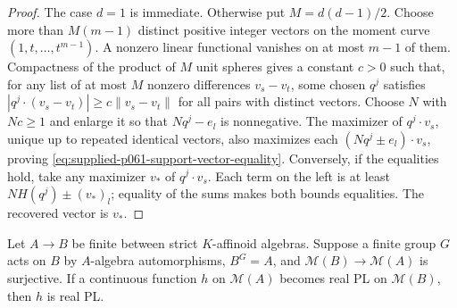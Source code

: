 \begin{proof}
The case $d=1$ is immediate. Otherwise put $M=d(d-1)/2$. Choose more than $M(m-1)$ distinct positive integer vectors on the moment curve $(1,t,\ldots,t^{m-1})$. A nonzero linear functional vanishes on at most $m-1$ of them. Compactness of the product of $M$ unit spheres gives a constant $c>0$ such that, for any list of at most $M$ nonzero differences $v_s-v_t$, some chosen $q^j$ satisfies $|q^j\cdot(v_s-v_t)|\geq c\|v_s-v_t\|$ for all pairs with distinct vectors. Choose $N$ with $Nc\geq1$ and enlarge it so that $Nq^j-e_l$ is nonnegative. The maximizer of $q^j\cdot v_s$, unique up to repeated identical vectors, also maximizes each $(Nq^j\pm e_l)\cdot v_s$, proving \eqref{eq:supplied-p061-support-vector-equality}. Conversely, if the equalities hold, take any maximizer $v_*$ of $q^j\cdot v_s$. Each term on the left is at least $NH(q^j)\pm(v_*)_l$; equality of the sums makes both bounds equalities. The recovered vector is $v_*$.
\end{proof}

\begin{proposition}\label{prop:supplied-p061-finite-group-descent}
Let $A\to B$ be finite between strict $K$-affinoid algebras. Suppose a finite group $G$ acts on $B$ by $A$-algebra automorphisms, $B^G=A$, and $\mathcal M(B)\to\mathcal M(A)$ is surjective. If a continuous function $h$ on $\mathcal M(A)$ becomes real PL on $\mathcal M(B)$, then $h$ is real PL.
\end{proposition}

